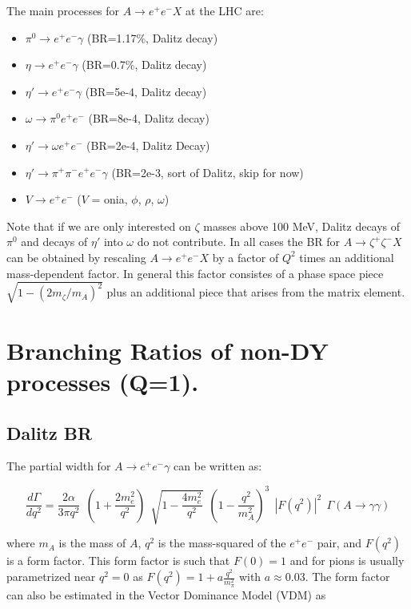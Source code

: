 \documentclass[12pt]{article}
\begin{document}
The main processes for  $A \to e^+ e^- X$ at the LHC are:
\begin{itemize}
    \item $\pi^0 \to e^+ e^- \gamma$  (BR=1.17\%, Dalitz decay)
    \item $\eta \to e^+ e^- \gamma$   (BR=0.7\%, Dalitz decay)
    \item $\eta' \to e^+ e^- \gamma$   (BR=5e-4, Dalitz decay)
    \item $\omega \to \pi^0 e^+ e^-$  (BR=8e-4, Dalitz decay)
    \item $\eta' \to \omega e^+ e^-$ (BR=2e-4, Dalitz Decay)
    \item $\eta' \to \pi^+ \pi^- e^+ e^- \gamma$ (BR=2e-3, sort of Dalitz, skip for now)
    \item $V \to e^+ e^-$ ($V$ = onia, $\phi$, $\rho$, $\omega$)
\end{itemize}

Note that if we are only interested on $\zeta$ masses above 100 MeV,
Dalitz decays of $\pi^0$ and decays of $\eta'$ into $\omega$
do not contribute.
In all cases the BR for $A \to \zeta^+ \zeta^- X$ can be obtained
by rescaling $A \to e^+ e^- X$ by a factor of $Q^2$ times an
additional mass-dependent factor.  In general this factor consistes
of a phase space piece $\sqrt{1 - (2m_\zeta/m_A)^2}$ plus an additional
piece that arises from the matrix element.

\section{Branching Ratios of non-DY processes (Q=1).}

\subsection{Dalitz BR}

The partial width for $A \to e^+ e^- \gamma$ can be written
as\cite{landsberg, bib:ulrik}:

\begin{equation}
\frac{d \Gamma}{d q^2} = \frac{2 \alpha}{3 \pi q^2}~~
(1+\frac{2m_e^2}{q^2})~~\sqrt{1 - \frac{4m_e^2}{q^2}}~~
(1 - \frac{q^2}{m_A^2})^3~~
|F(q^2)|^2 ~~
\Gamma(A \to \gamma \gamma) 
\label{dalitz1}
\end{equation}

\noindent where $m_A$ is the mass of $A$, $q^2$ is the mass-squared of the
$e^+e^-$ pair, 
and $F(q^2)$ is a form factor.
This form factor is such that $F(0)=1$ and for pions is usually
parametrized near $q^2=0$ as $F(q^2) = 1 + a \frac{q^2}{m_\pi^2}$ with
$a \approx 0.03$.  The form factor can also be estimated in the Vector
Dominance Model (VDM) as
\end{document}
